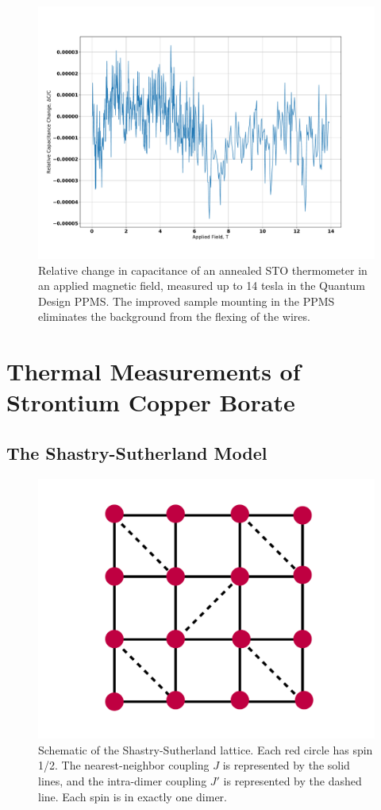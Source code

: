 \documentclass{thesis-umich}
\begin{document}
\begin{figure} \caption[Field response of an annealed STO thermometer]{Relative change in capacitance of an annealed STO
	thermometer in an applied magnetic field, measured up to 14 tesla in
the Quantum Design PPMS. The improved sample mounting in the PPMS eliminates
the background from the flexing of the wires.}
\includegraphics[width=\columnwidth]{figures/annealed_sto_dc_vs_b.pdf}
\end{figure}
	
\chapter{Thermal Measurements of Strontium Copper Borate}

\section{The Shastry-Sutherland Model}
\begin{figure}
	\caption[The Shastry-Sutherland lattice]{Schematic of the Shastry-Sutherland lattice. Each red circle has spin 1/2. The nearest-neighbor coupling $J$ is represented by the solid lines, and the intra-dimer coupling $J'$ is represented by the dashed line. Each spin is in exactly one dimer.}
	\includegraphics[width=\columnwidth]{figures/ss-model.pdf}
\end{figure}
\end{document}
